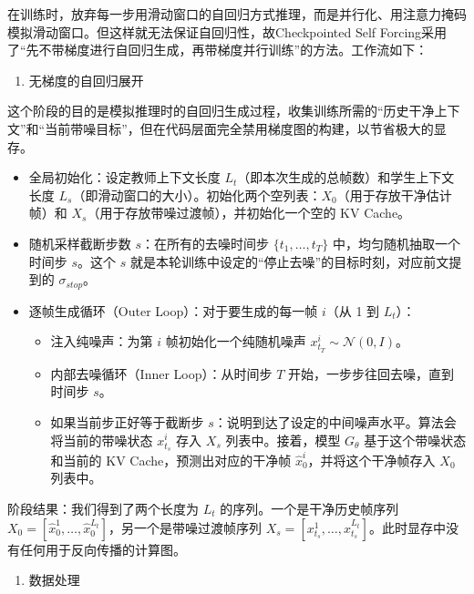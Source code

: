 在训练时，放弃每一步用滑动窗口的自回归方式推理，而是并行化、用注意力掩码模拟滑动窗口。但这样就无法保证自回归性，故Checkpointed Self Forcing采用了``先不带梯度进行自回归生成，再带梯度并行训练''的方法。工作流如下：

\begin{enumerate}
\def\labelenumi{\arabic{enumi}.}
\tightlist
\item
  无梯度的自回归展开
\end{enumerate}

这个阶段的目的是模拟推理时的自回归生成过程，收集训练所需的``历史干净上下文''和``当前带噪目标''，但在代码层面完全禁用梯度图的构建，以节省极大的显存。

\begin{itemize}
\tightlist
\item
  全局初始化：设定教师上下文长度 \(L_t\)（即本次生成的总帧数）和学生上下文长度 \(L_s\)（即滑动窗口的大小）。初始化两个空列表：\(X_0\)（用于存放干净估计帧）和 \(X_s\)（用于存放带噪过渡帧），并初始化一个空的 KV Cache。
\item
  随机采样截断步数 \(s\)：在所有的去噪时间步 \(\{t_1,\ldots,t_T\}\) 中，均匀随机抽取一个时间步 \(s\)。这个 \(s\) 就是本轮训练中设定的``停止去噪''的目标时刻，对应前文提到的 \(\sigma_{stop}\)。
\item
{}
  逐帧生成循环（Outer Loop）：对于要生成的每一帧 \(i\)（从 1 到 \(L_t\)）：

  \begin{itemize}
  \tightlist
  \item
    注入纯噪声：为第 \(i\) 帧初始化一个纯随机噪声 \(x_{t_T}^{i}\sim\mathcal{N}(0,I)\)。
  \item
    内部去噪循环（Inner Loop）：从时间步 \(T\) 开始，一步步往回去噪，直到时间步 \(s\)。
  \item
    如果当前步正好等于截断步 \(s\)：说明到达了设定的中间噪声水平。算法会将当前的带噪状态 \(x_{t_s}^{i}\) 存入 \(X_s\) 列表中。接着，模型 \(G_\theta\) 基于这个带噪状态和当前的 KV Cache，预测出对应的干净帧 \(\hat{x}_0^i\)，并将这个干净帧存入 \(X_0\) 列表中。
  \end{itemize}
\end{itemize}

阶段结果：我们得到了两个长度为 \(L_t\) 的序列。一个是干净历史帧序列 \(X_0=[\hat{x}_0^1,\ldots,\hat{x}_0^{L_t}]\)，另一个是带噪过渡帧序列 \(X_s=[x_{t_s}^1,\ldots,x_{t_s}^{L_t}]\)。此时显存中没有任何用于反向传播的计算图。

\begin{enumerate}
\def\labelenumi{\arabic{enumi}.}
\setcounter{enumi}{1}
\tightlist
\item
  数据处理
\end{enumerate}

